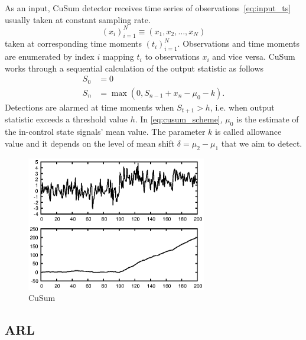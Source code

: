 As an input, CuSum detector receives time series of observations~\ref{eq:input_ts} usually taken at constant sampling rate.
\begin{equation}\label{eq:input_ts}
	(x_i)_{i=1}^{N} \equiv (x_1, x_2, \dots, x_N)
\end{equation}
taken at corresponding time moments $(t_i)_{i=1}^N$.
Observations and time moments are enumerated by index $i$ mapping $t_i$ to observations $x_i$ and vice versa.
CuSum works through a sequential calculation of the output statistic as follows
\begin{align}
	S_0 &= 0 \nonumber \\
	S_{n} &= \max (0, S_{n-1} + x_n - \mu_0 - k )\label{eq:cusum_scheme}.
\end{align}
Detections are alarmed at time moments when $S_{t+1} > h$, i.e. when output statistic exceeds a threshold value $h$.
In \eqref{eq:cusum_scheme}, $\mu_0$ is the estimate of the in-control state signals' mean value.
The parameter $k$ is called allowance value and it depends on the level of mean shift $\delta=\mu_2-\mu_1$ that we aim to detect.



\begin{figure}[!htb]
	\centering
	\includegraphics[width=0.7\textwidth]{images/example_output_cusum.eps}
	\caption{CuSum}\label{fig:cusum_output_example}
\end{figure}


\subsection{ARL}

